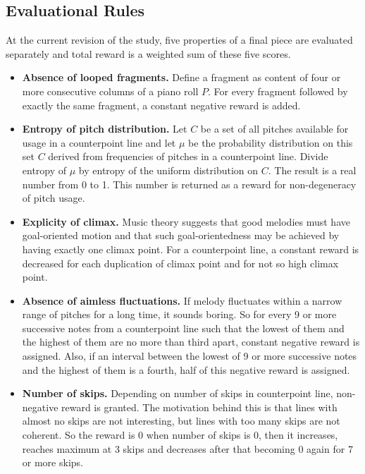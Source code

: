 \documentclass{article}
\begin{document}
\subsection{Evaluational Rules}
\label{subsec:setup}

At the current revision of the study, five properties of a final piece are evaluated separately and total reward is a weighted sum of these five scores.

\begin{itemize}
    \item \textbf{Absence of looped fragments.} Define a fragment as content of four or more consecutive columns of a piano roll $P$. For every fragment followed by exactly the same fragment, a constant negative reward is added.
    \item \textbf{Entropy of pitch distribution.} Let $C$ be a set of all pitches available for usage in a counterpoint line and let $\mu$ be the probability distribution on this set $C$ derived from frequencies of pitches in a counterpoint line. Divide entropy of $\mu$ by entropy of the uniform distribution on $C$. The result is a real number from 0 to 1. This number is returned as a reward for non-degeneracy of pitch usage.
    \item \textbf{Explicity of climax.} Music theory suggests that good melodies must have goal-oriented motion and that such goal-orientedness may be achieved by having exactly one climax point. For a counterpoint line, a constant reward is decreased for each duplication of climax point and for not so high climax point.
    \item \textbf{Absence of aimless fluctuations.} If melody fluctuates within a narrow range of pitches for a long time, it sounds boring. So for every 9 or more successive notes from a counterpoint line such that the lowest of them and the highest of them are no more than third apart, constant negative reward is assigned. Also, if an interval between the lowest of 9 or more successive notes and the highest of them is a fourth, half of this negative reward is assigned.
    \item \textbf{Number of skips.} Depending on number of skips in counterpoint line, non-negative reward is granted. The motivation behind this is that lines with almost no skips are not interesting, but lines with too many skips are not coherent. So the reward is 0 when number of skips is 0, then it increases, reaches maximum at 3 skips and decreases after that becoming 0 again for 7 or more skips. 
\end{itemize}
\end{document}
